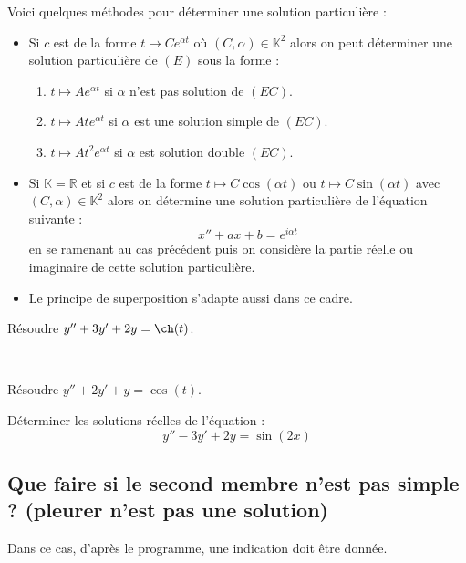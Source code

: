 \documentclass[french,11pt,twoside]{VcCours}
\begin{document}
\medskip

Voici quelques méthodes pour déterminer une solution particulière : 

\begin{itemize}
\item Si $c$ est de la forme $t \mapsto C e^{\alpha t}$ où $(C, \alpha) \in \mathbb{K}^2$ alors on peut déterminer une solution particulière de $(E)$ sous la forme :
\begin{enumerate}
\item $t \mapsto A e^{\alpha t}$ si $\alpha$ n'est pas solution de $(EC)$.
\item $t \mapsto At e^{\alpha t}$ si $\alpha$ est une solution \og simple \fg de $(EC)$.
\item $t \mapsto At^2 e^{\alpha t}$ si $\alpha$ est solution \og double \fg $(EC)$.
\end{enumerate}
\item Si $\mathbb{K}= \mathbb{R}$ et si $c$ est de la forme $t \mapsto C \cos(\alpha t)$ ou $t \mapsto C \sin(\alpha t)$ avec $(C, \alpha) \in \mathbb{K}^2$ alors on détermine une solution particulière de l'équation suivante :
$$ x''+ax+b= e^{i \alpha t}$$
en se ramenant au cas précédent puis on considère la partie réelle ou imaginaire de cette solution particulière.
\item Le principe de superposition s'adapte aussi dans ce cadre.
\end{itemize}

\begin{Exemple} Résoudre $y'' + 3y' + 2y = \ch(t)$.

\vspace{10cm}
\end{Exemple}

\newpage

$\phantom{test}$

\vspace{10cm}

\begin{Exemple} Résoudre $y''+2y'+y= \cos(t)$.

\vspace{10cm}
\end{Exemple}

\begin{ApplicationDirecte} Déterminer les solutions réelles de l'équation :
  \[
   y'' - 3y' + 2y = \sin(2x)
  \]
\end{ApplicationDirecte} 
\subsection{Que faire si le second membre n'est pas \og simple \fg ? (pleurer n'est pas une solution)}
Dans ce cas, d'après le programme, une indication doit être donnée.
\end{document}
